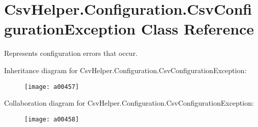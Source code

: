 \hypertarget{a00061}{\section{Csv\-Helper.\-Configuration.\-Csv\-Configuration\-Exception Class Reference}
\label{a00061}
}


Represents configuration errors that occur.  




Inheritance diagram for Csv\-Helper.\-Configuration.\-Csv\-Configuration\-Exception\-:
\nopagebreak
\begin{figure}[H]
\begin{center}
\leavevmode
\texttt{[image: a00457]}
\end{center}
\end{figure}


Collaboration diagram for Csv\-Helper.\-Configuration.\-Csv\-Configuration\-Exception\-:
\nopagebreak
\begin{figure}[H]
\begin{center}
\leavevmode
\texttt{[image: a00458]}
\end{center}
\end{figure}
